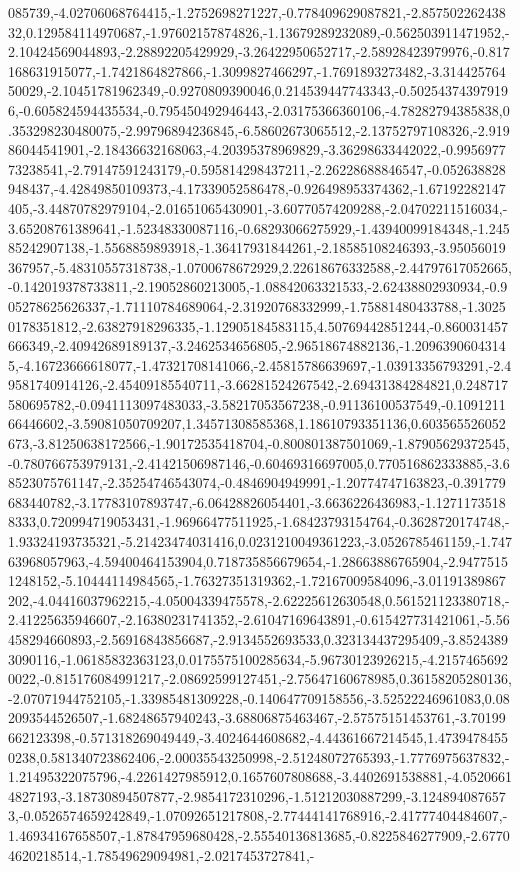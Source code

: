\documentclass{article}
\begin{document}
085739,-4.02706068764415,-1.2752698271227,-0.778409629087821,-2.85750226243832,0.129584114970687,-1.97602157874826,-1.13679289232089,-0.562503911471952,-2.10424569044893,-2.28892205429929,-3.26422950652717,-2.58928423979976,-0.817168631915077,-1.7421864827866,-1.3099827466297,-1.7691893273482,-3.31442576450029,-2.10451781962349,-0.9270809390046,0.214539447743343,-0.502543743979196,-0.605824594435534,-0.795450492946443,-2.03175366360106,-4.78282794385838,0.353298230480075,-2.99796894236845,-6.58602673065512,-2.13752797108326,-2.91986044541901,-2.18436632168063,-4.20395378969829,-3.36298633442022,-0.995697773238541,-2.79147591243179,-0.595814298437211,-2.26228688846547,-0.052638828948437,-4.42849850109373,-4.17339052586478,-0.926498953374362,-1.67192282147405,-3.44870782979104,-2.01651065430901,-3.60770574209288,-2.04702211516034,-3.65208761389641,-1.52348330087116,-0.68293066275929,-1.43940099184348,-1.24585242907138,-1.5568859893918,-1.36417931844261,-2.18585108246393,-3.95056019367957,-5.48310557318738,-1.0700678672929,2.22618676332588,-2.44797617052665,-0.142019378733811,-2.19052860213005,-1.08842063321533,-2.62438802930934,-0.905278625626337,-1.71110784689064,-2.31920768332999,-1.75881480433788,-1.30250178351812,-2.63827918296335,-1.12905184583115,4.50769442851244,-0.860031457666349,-2.40942689189137,-3.2462534656805,-2.96518674882136,-1.20963906043145,-4.16723666618077,-1.47321708141066,-2.45815786639697,-1.03913356793291,-2.49581740914126,-2.45409185540711,-3.66281524267542,-2.69431384284821,0.248717580695782,-0.0941113097483033,-3.58217053567238,-0.91136100537549,-0.109121166446602,-3.59081050709207,1.34571308585368,1.18610793351136,0.603565526052673,-3.81250638172566,-1.90172535418704,-0.800801387501069,-1.87905629372545,-0.780766753979131,-2.41421506987146,-0.60469316697005,0.770516862333885,-3.68523075761147,-2.35254746543074,-0.4846904949991,-1.20774747163823,-0.391779683440782,-3.17783107893747,-6.06428826054401,-3.6636226436983,-1.12711735188333,0.720994719053431,-1.96966477511925,-1.68423793154764,-0.3628720174748,-1.93324193735321,-5.21423474031416,0.0231210049361223,-3.0526785461159,-1.74763968057963,-4.59400464153904,0.718735856679654,-1.28663886765904,-2.94775151248152,-5.10444114984565,-1.76327351319362,-1.72167009584096,-3.01191389867202,-4.04416037962215,-4.05004339475578,-2.62225612630548,0.561521123380718,-2.41225635946607,-2.16380231741352,-2.61047169643891,-0.615427731421061,-5.56458294660893,-2.56916843856687,-2.9134552693533,0.323134437295409,-3.85243893090116,-1.06185832363123,0.0175575100285634,-5.96730123926215,-4.21574656920022,-0.815176084991217,-2.08692599127451,-2.75647160678985,0.36158205280136,-2.07071944752105,-1.33985481309228,-0.140647709158556,-3.52522246961083,0.082093544526507,-1.68248657940243,-3.68806875463467,-2.57575151453761,-3.70199662123398,-0.571318269049449,-3.4024644608682,-4.44361667214545,1.47394784550238,0.581340723862406,-2.00035543250998,-2.51248072765393,-1.7776975637832,-1.21495322075796,-4.2261427985912,0.1657607808688,-3.4402691538881,-4.05206614827193,-3.18730894507877,-2.9854172310296,-1.51212030887299,-3.1248940876573,-0.0526574659242849,-1.07092651217808,-2.77444141768916,-2.41777404484607,-1.46934167658507,-1.87847959680428,-2.55540136813685,-0.8225846277909,-2.67704620218514,-1.78549629094981,-2.0217453727841,-
\end{document}
